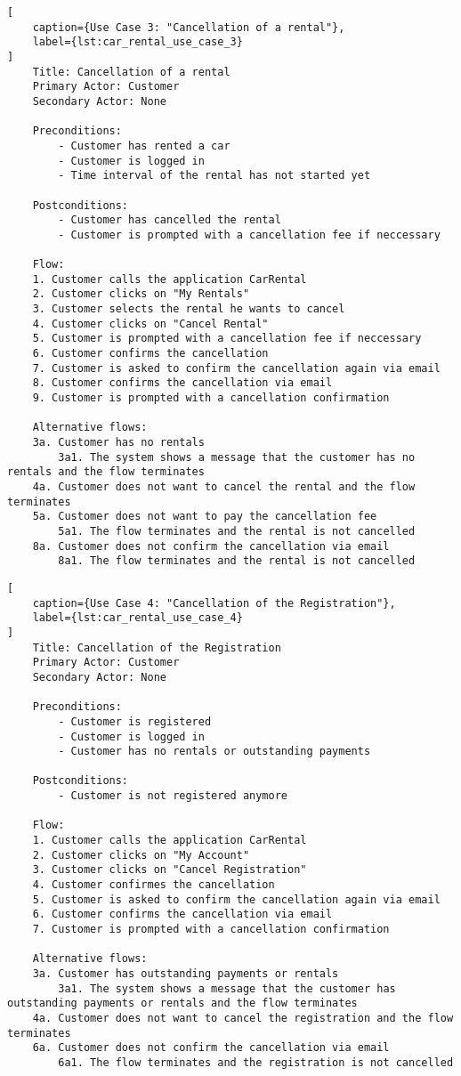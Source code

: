 \begin{lstlisting}[
    caption={Use Case 3: "Cancellation of a rental"},
    label={lst:car_rental_use_case_3}
]
    Title: Cancellation of a rental
    Primary Actor: Customer
    Secondary Actor: None

    Preconditions:
        - Customer has rented a car
        - Customer is logged in
        - Time interval of the rental has not started yet

    Postconditions:
        - Customer has cancelled the rental
        - Customer is prompted with a cancellation fee if neccessary

    Flow:
    1. Customer calls the application CarRental
    2. Customer clicks on "My Rentals"
    3. Customer selects the rental he wants to cancel
    4. Customer clicks on "Cancel Rental"
    5. Customer is prompted with a cancellation fee if neccessary
    6. Customer confirms the cancellation
    7. Customer is asked to confirm the cancellation again via email
    8. Customer confirms the cancellation via email
    9. Customer is prompted with a cancellation confirmation

    Alternative flows:
    3a. Customer has no rentals
        3a1. The system shows a message that the customer has no rentals and the flow terminates
    4a. Customer does not want to cancel the rental and the flow terminates
    5a. Customer does not want to pay the cancellation fee
        5a1. The flow terminates and the rental is not cancelled
    8a. Customer does not confirm the cancellation via email
        8a1. The flow terminates and the rental is not cancelled

\end{lstlisting}

\begin{lstlisting}[
    caption={Use Case 4: "Cancellation of the Registration"},
    label={lst:car_rental_use_case_4}
]
    Title: Cancellation of the Registration
    Primary Actor: Customer
    Secondary Actor: None

    Preconditions:
        - Customer is registered
        - Customer is logged in
        - Customer has no rentals or outstanding payments

    Postconditions:
        - Customer is not registered anymore

    Flow:
    1. Customer calls the application CarRental
    2. Customer clicks on "My Account"
    3. Customer clicks on "Cancel Registration"
    4. Customer confirmes the cancellation
    5. Customer is asked to confirm the cancellation again via email
    6. Customer confirms the cancellation via email
    7. Customer is prompted with a cancellation confirmation

    Alternative flows:
    3a. Customer has outstanding payments or rentals
        3a1. The system shows a message that the customer has outstanding payments or rentals and the flow terminates
    4a. Customer does not want to cancel the registration and the flow terminates
    6a. Customer does not confirm the cancellation via email
        6a1. The flow terminates and the registration is not cancelled
\end{lstlisting}
